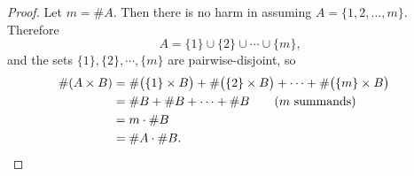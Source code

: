 \documentclass[../MATH-2000-Notes.tex]{subfiles}
\begin{document}
\begin{proof}
    Let $m = \#A$. Then there is no harm in assuming $A = \{1,2,\ldots,m\}$. Therefore
    $$ A = \{1\} \cup \{2\} \cup \cdots \cup \{m\} ,$$
    and the sets $\{1\} , \{2\} , \cdots , \{m\}$ are pairwise-disjoint, so
    \begin{align*}
        \#(A \times B)
         & = \#\bigl( \{1\} \times B\bigr) +  \#\bigl( \{2\} \times B \bigr) + \cdots +  \#\bigl( \{m\} \times B \bigr)
         &
        \\&= \#B +   \#B + \cdots +   \#B \qquad \text{($m$ summands)}
         &
        \\&= m \cdot \#B
        \\& = \#A \cdot \#B
        . \qedhere\end{align*}
\end{proof}
\end{document}

